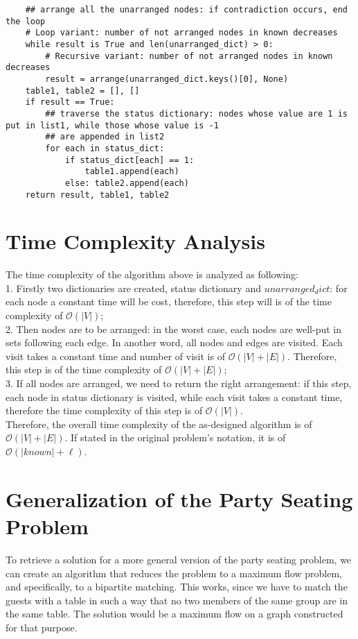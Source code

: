 \documentclass[a4paper,11pt]{article}
\begin{document}
\begin{lstlisting}
    ## arrange all the unarranged nodes: if contradiction occurs, end the loop
    # Loop variant: number of not arranged nodes in known decreases
    while result is True and len(unarranged_dict) > 0:
        # Recursive variant: number of not arranged nodes in known decreases
        result = arrange(unarranged_dict.keys()[0], None)
    table1, table2 = [], []
    if result == True:
        ## traverse the status dictionary: nodes whose value are 1 is put in list1, while those whose value is -1
        ## are appended in list2
        for each in status_dict:
            if status_dict[each] == 1:
                table1.append(each)
            else: table2.append(each)
    return result, table1, table2
\end{lstlisting}

\section{Time Complexity Analysis}
The time complexity of the algorithm above is analyzed as following: \\
1. Firstly two dictionaries are created, status dictionary and $unarranged_dict$: for each node a constant time will be cost, therefore, this step will is of the time complexity of $\mathcal{O}(|V|)$; \\

2. Then nodes are to be arranged: in the worst case, each nodes are well-put in sets following each edge. In another word, all nodes and edges are visited. Each visit takes a constant time and number of visit is of $\mathcal{O}(|V| + |E|)$. Therefore, this step is of the time complexity of $\mathcal{O}(|V| + |E|)$;\\

3. If all nodes are arranged, we need to return the right arrangement: if this step, each node in status dictionary is visited, while each visit takes a constant time, therefore the time complexity of this step is of $\mathcal{O}(|V|)$. \\

Therefore, the overall time complexity of the as-designed algorithm is of $\mathcal{O}(|V| + |E|)$. If stated in the original problem's notation, it is of $\mathcal{O}(|known| + \ell)$.

\section{Generalization of the Party Seating Problem}
To retrieve a solution for a more general version of the party seating problem, we can create an algorithm that reduces the problem to a maximum flow problem, and specifically, to a bipartite matching. This works, since we have to match the guests with a table in such a way that no two members of the same group are in the same table. The solution would be a maximum flow on a graph constructed for that purpose.\\
\end{document}
